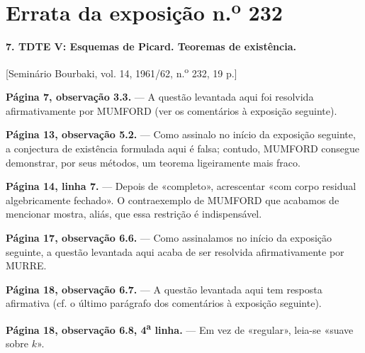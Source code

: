 \clearpage
\chapter*{Errata da exposição n.\textsuperscript{o} 232}

\noindent\textbf{7. TDTE V: Esquemas de Picard. Teoremas de existência.}

\begin{center}
[Seminário Bourbaki, vol. 14, 1961/62, n.\textsuperscript{o} 232, 19 p.]
\end{center}

\noindent\textbf{Página 7, observação 3.3.} --- A questão levantada aqui foi
resolvida afirmativamente por MUMFORD (ver os comentários à exposição seguinte).

\noindent\textbf{Página 13, observação 5.2.} --- Como assinalo no início da
exposição seguinte, a conjectura de existência formulada aqui é falsa; contudo,
MUMFORD consegue demonstrar, por seus métodos, um teorema ligeiramente mais
fraco.

\noindent\textbf{Página 14, linha 7.} --- Depois de «completo», acrescentar «com
corpo residual algebricamente fechado». O contraexemplo de MUMFORD que acabamos
de mencionar mostra, aliás, que essa restrição é indispensável.

\noindent\textbf{Página 17, observação 6.6.} --- Como assinalamos no início da
exposição seguinte, a questão levantada aqui acaba de ser resolvida
afirmativamente por MURRE.

\noindent\textbf{Página 18, observação 6.7.} --- A questão levantada aqui tem
resposta afirmativa (cf. o último parágrafo dos comentários à exposição
seguinte).

\noindent\textbf{Página 18, observação 6.8, 4\textsuperscript{a} linha.} --- Em vez de
«regular», leia-se «suave sobre $k$».
